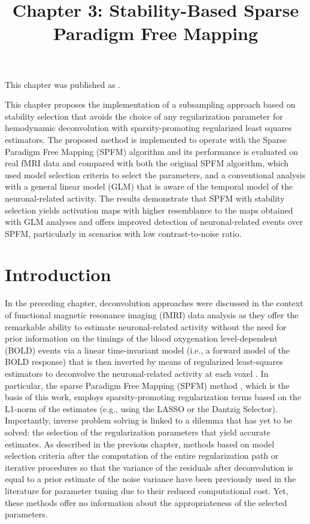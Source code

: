 \title{Chapter 3: Stability-Based Sparse Paradigm Free Mapping}
\label{cha:stability}

This chapter was published as \cite{Urunuela2020StabilityBasedSparse}.

This chapter proposes the implementation of a subsampling approach based on
stability selection that avoids the choice of any regularization parameter for
hemodynamic deconvolution with sparsity-promoting regularized least squares
estimators. The proposed method is implemented to operate with the Sparse
Paradigm Free Mapping (SPFM) algorithm and its performance is evaluated on real fMRI
data and compared with both the original SPFM algorithm, which used model
selection criteria to select the parameters, and a conventional analysis with a
general linear model (GLM) that is aware of the temporal model of the
neuronal-related activity. The results demonstrate that SPFM with stability
selection yields activation maps with higher resemblance to the maps obtained
with GLM analyses and offers improved detection of neuronal-related events over
SPFM, particularly in scenarios with low contrast-to-noise ratio.

\section{Introduction}
\label{sec:stability_introduction}

In the preceding chapter, deconvolution approaches were discussed in the context
of functional magnetic resonance imaging (fMRI) data analysis as they offer the
remarkable ability to estimate neuronal-related activity without the need for
prior information on the timings of the blood oxygenation level-dependent (BOLD)
events via a linear time-invariant model (i.e., a forward model of the BOLD
response) that is then inverted by means of regularized least-squares estimators
to deconvolve the neuronal-related activity at each voxel
\citep{Gitelman2003Modelingregionalpsychophysiologic,Khalidov2011ActiveletsWaveletssparse,Karahanoglu2013TotalactivationfMRI,HernandezGarcia2011Neuronaleventdetection,Gaudes2010Detectioncharacterizationsingle,Gaudes2013Paradigmfreemapping}.
In particular, the sparse Paradigm Free Mapping (SPFM) method
\citep{Gaudes2013Paradigmfreemapping}, which is the basis of this work, employs
sparsity-promoting regularization terms based on the L1-norm of the estimates
(e.g., using the LASSO or the Dantzig Selector). Importantly, inverse problem
solving is linked to a dilemma that has yet to be solved: the selection of the
regularization parameters that yield accurate estimates. As described in the
previous chapter,  methods based on model selection criteria after the
computation of the entire regularization path
\citep{Gaudes2013Paradigmfreemapping} or iterative procedures so that the
variance of the residuals after deconvolution is equal to a prior estimate of
the noise variance \citep{Karahanoglu2013TotalactivationfMRI} have been
previously used in the literature for parameter tuning due to their reduced
computational cost. Yet, these methods offer no information about the
appropriateness of the selected parameters.

